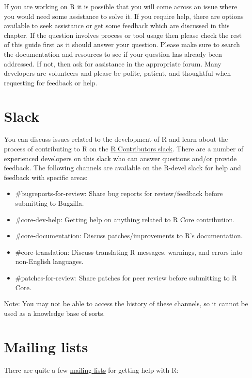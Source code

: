 \documentclass[
]{book}
\begin{document}
If you are working on R it is possible that you will come across an issue where you would need some assistance to solve it. If you require help, there are options available to seek assistance or get some feedback which are discussed in this chapter. If the question involves process or tool usage then please check the rest of this guide first as it should answer your question. Please make sure to search the documentation and resources to see if your question has already been addressed. If not, then ask for assistance in the appropriate forum. Many developers are volunteers and please be polite, patient, and thoughtful when requesting for feedback or help.

\section{Slack}\label{slack}

You can discuss issues related to the development of R and learn about the process of contributing to R on the \href{https://r-contributors.slack.com/}{R Contributors slack}. There are a number of experienced developers on this slack who can answer questions and/or provide feedback. The following channels are available on the R-devel slack for help and feedback with specific areas:

\begin{itemize}
\item
  \#bugreports-for-review: Share bug reports for review/feedback before submitting to Bugzilla.
\item
  \#core-dev-help: Getting help on anything related to R Core contribution.
\item
  \#core-documentation: Discuss patches/improvements to R's documentation.
\item
  \#core-translation: Discuss translating R messages, warnings, and errors into non-English languages.
\item
  \#patches-for-review: Share patches for peer review before submitting to R Core.
\end{itemize}

Note: You may not be able to access the history of these channels, so it cannot be used as a knowledge base of sorts.

\section{Mailing lists}\label{mailing-lists}

There are quite a few \href{https://www.r-project.org/mail.html}{mailing lists} for getting help with R:
\end{document}
